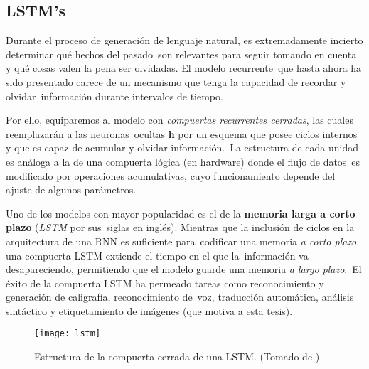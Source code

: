\subsection{LSTM's}

Durante el proceso de generación de lenguaje natural, es extremadamente incierto determinar qué hechos del pasado\
son relevantes para seguir tomando en cuenta y qué cosas valen la pena ser olvidadas. El modelo recurrente\
que hasta ahora ha sido presentado carece de un mecanismo que tenga la capacidad de recordar y olvidar\
información durante intervalos de tiempo.\par
Por ello, equiparemos al modelo con \emph{compuertas recurrentes cerradas}, las cuales reemplazarán a las neuronas\
ocultas $\mathbf{h}$ por un esquema que posee ciclos internos y que es capaz de acumular y olvidar información.\
La estructura de cada unidad es análoga a la de una compuerta lógica (en hardware) donde el flujo de datos\
es modificado por operaciones acumulativas, cuyo funcionamiento depende del ajuste de algunos parámetros.\par
Uno de los modelos con mayor popularidad es el de la \textbf{memoria larga a corto plazo} (\emph{LSTM} por sus\
siglas en inglés). Mientras que la inclusión de ciclos en la arquitectura de una RNN es suficiente para\
codificar una memoria \emph{a corto plazo}, una compuerta LSTM extiende el tiempo en el que la\
información va desapareciendo, permitiendo que el modelo guarde una memoria \emph{a largo plazo}.\
El éxito de la compuerta LSTM ha permeado tareas como reconocimiento y generación de caligrafía, reconocimiento de\
voz, traducción automática, análisis sintáctico y etiquetamiento de imágenes (que motiva a esta tesis).

\begin{figure}
  \centering
  \texttt{[image: lstm]}
  \caption{Estructura de la compuerta cerrada de una LSTM.
    (Tomado de \cite{goodfellow-et-al-2016})}
  \label{convnet_fig}
\end{figure}

